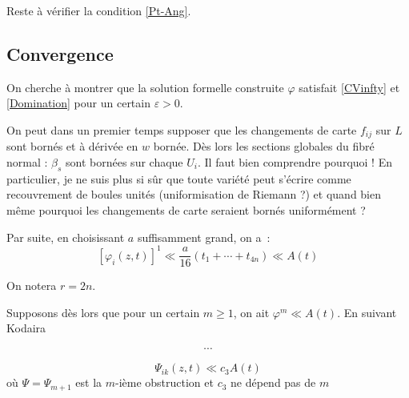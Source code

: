 \documentclass[a4paper,10pt,draft,makeidx,twocolumn]{amsart}
\begin{document}
Reste à vérifier la condition \eqref{Pt-Ang}. \excl

\subsection{Convergence}
On cherche à montrer que la solution formelle construite $\varphi$ satisfait \eqref{CVinfty} et \eqref{Domination} pour un certain $\varepsilon>0$.

On peut dans un premier temps supposer que les changements de carte $f_{ij}$ sur $L$ sont bornés et à dérivée en $w$ bornée. Dès lors les sections globales du fibré normal : $\beta_s$ sont bornées sur chaque $U_i$. Il faut bien comprendre pourquoi ! \? En particulier, je ne suis plus si sûr que toute variété peut s'écrire comme recouvrement de boules unités (uniformisation de Riemann ?) et quand bien même pourquoi les changements de carte seraient bornés uniformément ? 

Par suite, en choisissant $a$ suffisamment grand, on a~:
\begin{equation}
\left[\varphi_i(z,t)\right]^1 \ll \dfrac{a}{16}(t_1 + \cdots + t_{4n}) \ll A(t)
\end{equation}

On notera $r = 2n$.

Supposons dès lors que pour un certain $m \geq 1$, on ait $\varphi^m \ll A(t)$. En suivant Kodaira

\[
\cdots
\]

\begin{equation}
\Psi_{ik}(z,t) \ll c_3 A(t)
\end{equation}
où $\Psi =\Psi_{m+1}$ est la $m$-ième obstruction et $c_3$ ne dépend pas de $m$
\end{document}

